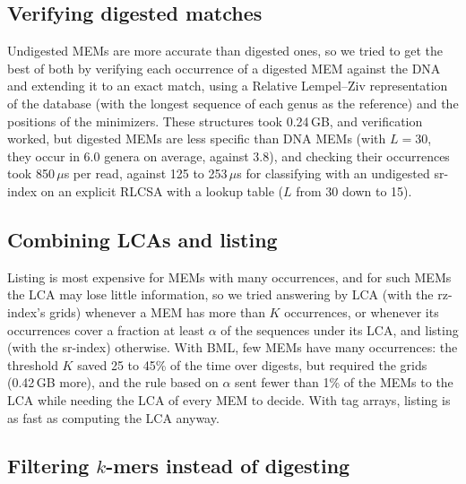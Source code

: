 \subsection{Verifying digested matches}

Undigested MEMs are more accurate than digested ones, so we tried to get the best of both by verifying each occurrence of a digested MEM against the DNA and extending it to an exact match, using a Relative Lempel--Ziv representation of the database (with the longest sequence of each genus as the reference) and the positions of the minimizers.
These structures took 0.24\,GB, and verification worked, but digested MEMs are less specific than DNA MEMs (with $L = 30$, they occur in 6.0 genera on average, against 3.8), and checking their occurrences took 850\,$\mu$s per read, against 125 to 253\,$\mu$s for classifying with an undigested sr-index on an explicit RLCSA with a lookup table ($L$ from 30 down to 15).

\subsection{Combining LCAs and listing}

Listing is most expensive for MEMs with many occurrences, and for such MEMs the LCA may lose little information, so we tried answering by LCA (with the rz-index's grids) whenever a MEM has more than $K$ occurrences, or whenever its occurrences cover a fraction at least $\alpha$ of the sequences under its LCA, and listing (with the sr-index) otherwise.
With BML, few MEMs have many occurrences: the threshold $K$ saved 25 to 45\% of the time over digests, but required the grids (0.42\,GB more), and the rule based on $\alpha$ sent fewer than 1\% of the MEMs to the LCA while needing the LCA of every MEM to decide.
With tag arrays, listing is as fast as computing the LCA anyway.

\subsection{Filtering \texorpdfstring{$k$}{k}-mers instead of digesting}

